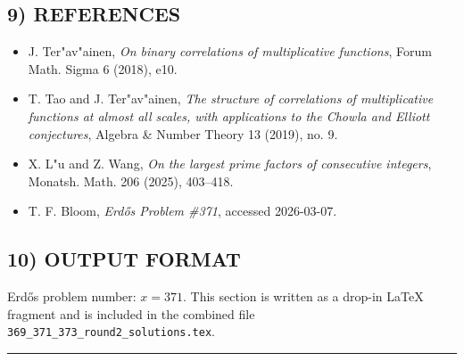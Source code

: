 \subsection*{9) REFERENCES}
\begin{itemize}
\item J. Ter"av"ainen, \emph{On binary correlations of multiplicative functions}, Forum Math. Sigma 6 (2018), e10.
\item T. Tao and J. Ter"av"ainen, \emph{The structure of correlations of multiplicative functions at almost all scales, with applications to the Chowla and Elliott conjectures}, Algebra \& Number Theory 13 (2019), no. 9.
\item X. L"u and Z. Wang, \emph{On the largest prime factors of consecutive integers}, Monatsh. Math. 206 (2025), 403--418.
\item T. F. Bloom, \emph{Erd\H{o}s Problem \#371}, accessed 2026-03-07.
\end{itemize}

\subsection*{10) OUTPUT FORMAT}
Erd\H{o}s problem number: $x=371$. This section is written as a drop-in \LaTeX{} fragment and is included in the combined file \texttt{369\_371\_373\_round2\_solutions.tex}.

\bigskip
\hrule
\bigskip

